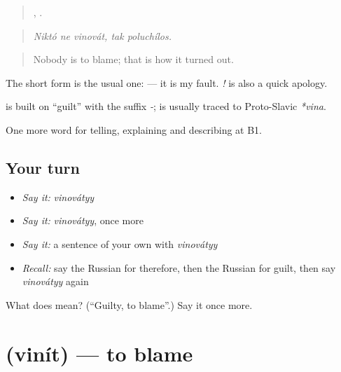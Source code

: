 \begin{quote}
  ,  .
\end{quote}

\begin{quote}
\emph{Niktó ne vinovát, tak poluchílos.}
\end{quote}

\begin{quote}
Nobody is to blame; that is how it turned out.
\end{quote}

The short form \emph{} is the usual one: \emph{ } — it is my fault. \emph{!} is also a quick apology.

\begin{cousinweb}
\textbf{} is built on \emph{} \textquotedblleft{}guilt\textquotedblright{} with the suffix \emph{-}; \emph{} is usually traced to Proto-Slavic \emph{*vina}.
\end{cousinweb}

\begin{grammarlens}[title={What you've built}]
One more word for telling, explaining and describing at B1.
\end{grammarlens}

\subsection*{Your turn}
\begin{itemize}
\raggedright
  \item \emph{Say it:} \emph{vinovátyy}
  \item \emph{Say it:} \emph{vinovátyy}, once more
  \item \emph{Say it:} a sentence of your own with \emph{vinovátyy}
  \item \emph{Recall:} say the Russian for therefore, then the Russian for guilt, then say \emph{vinovátyy} again
\end{itemize}

\begin{tcolorbox}[breakable,colback=teal!4,colframe=teal!35!black,title={Before you move on}]
What does  mean? (\textquotedblleft{}Guilty, to blame\textquotedblright{}.) Say it once more.
\end{tcolorbox}
\section[\texorpdfstring{\ru{винить} (vinít)}{винить (vinít)}]{ (vinít) — to blame}

